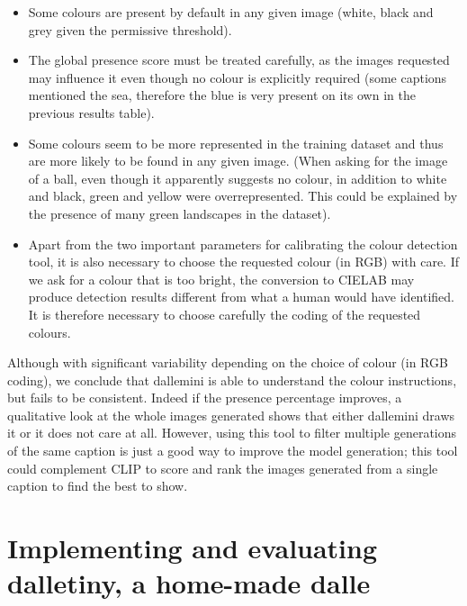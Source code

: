 \documentclass{article}
\begin{document}
\begin{multicols}{2}
\begin{itemize}
    \item Some colours are present by default in any given image (white, black and grey given the permissive threshold).
    \item The global presence score must be treated carefully, as the images requested may influence it even though no colour is explicitly required (some captions mentioned the sea, therefore the blue is very present on its own in the previous results table).
    \item Some colours seem to be more represented in the training dataset and thus are more likely to be found in any given image. (When asking for the image of a ball, even though it apparently suggests no colour, in addition to white and black, green and yellow were overrepresented. This could be explained by the presence of many green landscapes in the dataset).
    \item Apart from the two important parameters for calibrating the colour detection tool, it is also necessary to choose the requested colour (in RGB) with care. If we ask for a colour that is too bright, the conversion to CIELAB may produce detection results different from what a human would have identified. It is therefore necessary to choose carefully the coding of the requested colours.
\end{itemize}  

Although with significant variability depending on the choice of colour (in RGB coding), we conclude that \gls{dallemini} is able to understand the colour instructions, but fails to be consistent. Indeed if the presence percentage improves, a qualitative look at the whole images generated shows that either \gls{dallemini} draws it or it does not care at all. However, using this tool to filter multiple generations of the same caption is just a good way to improve the model generation; this tool could complement CLIP to score and rank the images generated from a single caption to find the best to show.

\end{multicols}


\section{Implementing and evaluating \gls{dalletiny}, a home-made \gls{dalle}} \label{sec:dalletiny}
\end{document}
